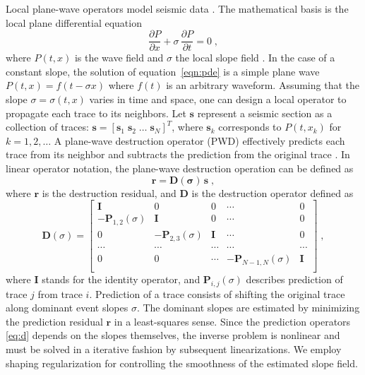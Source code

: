 
Local plane-wave operators model seismic data  \cite[]{FomelPWD} . The mathematical basis is the local plane differential equation
\begin{equation}
  \frac{\partial P}{\partial x} + 
  \sigma\,\frac{\partial P}{\partial t} = 0\;,
  \label{eqn:pde}
\end{equation}
where $P(t,x)$ is the wave field and $\sigma$ the local slope field \cite[]{ClareboutESA}. 
In the case of a constant slope, the solution of equation~\ref{eqn:pde} is a simple plane wave
$ P(t,x) = f(t - \sigma x)$ where $f(t)$ is an arbitrary waveform. Assuming
that the slope $\sigma=\sigma(t,x)$ varies in time and space, one can design
a local operator to propagate each trace to its neighbors. Let $\mathbf{s}$ represent a seismic section as a collection of traces: $\mathbf{s} =
\left[\mathbf{s}_1 \; \mathbf{s}_2 \; \ldots \;
\mathbf{s}_N\right]^T$, where $\mathbf{s}_k$ corresponds to $P(t,x_k)$
for $k=1,2,\ldots$ A plane-wave destruction operator (PWD) effectively
predicts each trace from its neighbor and subtracts the prediction
from the original trace \citep{FomelPWD}.  In linear operator
notation, the plane-wave destruction operation can be defined as
\begin{equation}
  \label{eq:pwd}
  \mathbf{r} = \mathbf{D(\sigma)\,s}\;,
\end{equation}
where $\mathbf{r}$ is the destruction residual, and $\mathbf{D}$ is the
destruction operator defined as
\begin{equation}
  \label{eq:d}
  \mathbf{D}(\sigma) = 
  \left[\begin{array}{ccccc}
      \mathbf{I} & 0 & 0 & \cdots & 0 \\
      - \mathbf{P}_{1,2}(\sigma) & \mathbf{I} & 0 & \cdots & 0 \\
      0 & - \mathbf{P}_{2,3}(\sigma) & \mathbf{I} & \cdots & 0 \\
      \cdots & \cdots & \cdots & \cdots & \cdots \\
      0 & 0 & \cdots & - \mathbf{P}_{N-1,N}(\sigma) & \mathbf{I} \\
    \end{array}\right]\;,
\end{equation}
where $\mathbf{I}$ stands for the identity operator, and
$\mathbf{P}_{i,j}(\sigma)$ describes prediction of trace $j$ from
trace $i$. Prediction of a trace consists of shifting the original
trace along dominant event slopes $\sigma$. The dominant slopes are
estimated by minimizing the prediction residual $\mathbf{r}$ in a
least-squares sense. Since the prediction operators \ref{eq:d} depends
on the slopes themselves, the inverse problem is nonlinear and must
be solved in a iterative fashion by subsequent linearizations. We 
employ shaping regularization \citep{FomelShaping} for controlling the
smoothness of the estimated slope field.

